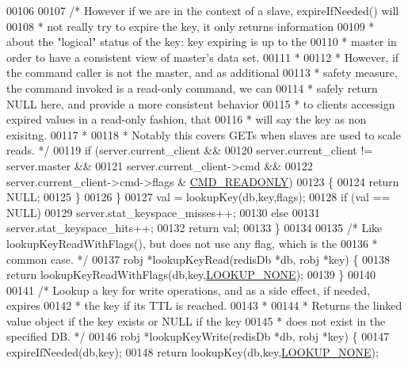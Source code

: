 \begin{DoxyCode}
00106 
00107         \textcolor{comment}{/* However if we are in the context of a slave, expireIfNeeded() will}
00108 \textcolor{comment}{         * not really try to expire the key, it only returns information}
00109 \textcolor{comment}{         * about the "logical" status of the key: key expiring is up to the}
00110 \textcolor{comment}{         * master in order to have a consistent view of master's data set.}
00111 \textcolor{comment}{         *}
00112 \textcolor{comment}{         * However, if the command caller is not the master, and as additional}
00113 \textcolor{comment}{         * safety measure, the command invoked is a read-only command, we can}
00114 \textcolor{comment}{         * safely return NULL here, and provide a more consistent behavior}
00115 \textcolor{comment}{         * to clients accessign expired values in a read-only fashion, that}
00116 \textcolor{comment}{         * will say the key as non exisitng.}
00117 \textcolor{comment}{         *}
00118 \textcolor{comment}{         * Notably this covers GETs when slaves are used to scale reads. */}
00119         \textcolor{keywordflow}{if} (server.current\_client &&
00120             server.current\_client != server.master &&
00121             server.current\_client->cmd &&
00122             server.current\_client->cmd->flags & \hyperlink{server_8h_a7e9c728f228e1c82ae1e22173375abcf}{CMD\_READONLY})
00123         \{
00124             \textcolor{keywordflow}{return} NULL;
00125         \}
00126     \}
00127     val = lookupKey(db,key,flags);
00128     \textcolor{keywordflow}{if} (val == NULL)
00129         server.stat\_keyspace\_misses++;
00130     \textcolor{keywordflow}{else}
00131         server.stat\_keyspace\_hits++;
00132     \textcolor{keywordflow}{return} val;
00133 \}
00134 
00135 \textcolor{comment}{/* Like lookupKeyReadWithFlags(), but does not use any flag, which is the}
00136 \textcolor{comment}{ * common case. */}
00137 robj *lookupKeyRead(redisDb *db, robj *key) \{
00138     \textcolor{keywordflow}{return} lookupKeyReadWithFlags(db,key,\hyperlink{server_8h_a72b53acd3e3042660b3b76685a6335ca}{LOOKUP\_NONE});
00139 \}
00140 
00141 \textcolor{comment}{/* Lookup a key for write operations, and as a side effect, if needed, expires}
00142 \textcolor{comment}{ * the key if its TTL is reached.}
00143 \textcolor{comment}{ *}
00144 \textcolor{comment}{ * Returns the linked value object if the key exists or NULL if the key}
00145 \textcolor{comment}{ * does not exist in the specified DB. */}
00146 robj *lookupKeyWrite(redisDb *db, robj *key) \{
00147     expireIfNeeded(db,key);
00148     \textcolor{keywordflow}{return} lookupKey(db,key,\hyperlink{server_8h_a72b53acd3e3042660b3b76685a6335ca}{LOOKUP\_NONE});

\end{DoxyCode}
